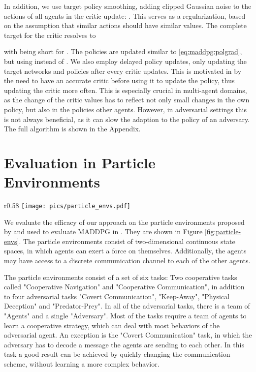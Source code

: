 \documentclass{article}
\begin{document}
In addition, we use target policy smoothing, adding clipped Gaussian noise  to the actions of all agents in the critic update: .
This serves as a regularization, based on the assumption that similar actions should have similar values.
The complete target for the critic resolves to

with  being short for .
The policies are updated similar to \eqref{eq:maddpg:polgrad}, but using  instead of .
We also employ delayed policy updates, only updating the target networks  and policies  after every  critic updates.
This is motivated in \cite{Fujimoto2018} by the need to have an accurate critic before using it to update the policy, thus updating the critic more often.
This is especially crucial in multi-agent domains, as the change of the critic values has to reflect not only small changes in the own policy, but also in the policies other agents.
However, in adversarial settings this is not always beneficial, as it can slow the adaption to the policy of an adversary.
The full algorithm is shown in the Appendix.

\section{Evaluation in Particle Environments}
\label{sec:particle_eval}
\begin{wrapfigure}[15]{r}{0.58\textwidth}
	\centering
	\texttt{[image: pics/particle\_envs.pdf]}
	\caption{Illustration of the particle environment tasks used in our evaluation. Left to right, top to bottom: "Cooperative Communication", "Cooperative Navigation", "Covert Communication", "Keep-away", "Physical Deception", "Predator-Prey". The figure is based on \protect\cite{Lowe2017}.}
	\label{fig:particle-envs}
\end{wrapfigure}

We evaluate the efficacy of our approach on the particle environments proposed by \cite{Mordatch2017} and used to evaluate \gls*{MADDPG} in \cite{Lowe2017}.  They are shown in Figure \ref{fig:particle-envs}.
The particle environments consist of two-dimensional continuous state spaces, in which agents can exert a force on themselves.
Additionally, the agents may have access to a discrete communication channel to each of the other agents.

The particle environments consist of a set of six tasks:
Two cooperative tasks called "Cooperative Navigation" and "Cooperative Communication", in addition to four adversarial tasks "Covert Communication", "Keep-Away", "Physical Deception" and "Predator-Prey". 
In all of the adversarial tasks, there is a team of "Agents" and a single "Adversary".
Most of the tasks require a team of agents to learn a cooperative strategy, which can deal with most behaviors of the adversarial agent.
An exception is the "Covert Communication" task, in which the adversary has to decode a message the agents are sending to each other. 
In this task a good result can be achieved by quickly changing the communication scheme, without learning a more complex behavior.
\end{document}
